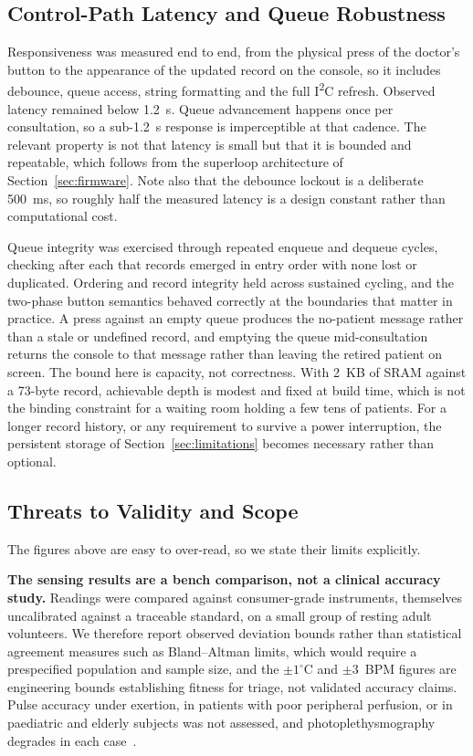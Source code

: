 \subsection{Control-Path Latency and Queue Robustness}
Responsiveness was measured end to end, from the physical press of the doctor's button to the
appearance of the updated record on the console, so it includes debounce, queue access, string
formatting and the full I\textsuperscript{2}C refresh. Observed latency remained below 1.2~s. Queue
advancement happens once per consultation, so a sub-1.2~s response is imperceptible at that cadence.
The relevant property is not that latency is small but that it is bounded and repeatable, which
follows from the superloop architecture of Section~\ref{sec:firmware}. Note also that the debounce
lockout is a deliberate 500~ms, so roughly half the measured latency is a design constant rather than
computational cost.

Queue integrity was exercised through repeated enqueue and dequeue cycles, checking after each that
records emerged in entry order with none lost or duplicated. Ordering and record integrity held
across sustained cycling, and the two-phase button semantics behaved correctly at the boundaries
that matter in practice. A press against an empty queue produces the no-patient message rather than
a stale or undefined record, and emptying the queue mid-consultation returns the console to that
message rather than leaving the retired patient on screen. The bound here is capacity, not
correctness. With 2~KB of SRAM against a 73-byte record, achievable depth is modest and fixed at
build time, which is not the binding constraint for a waiting room holding a few tens of patients.
For a longer record history, or any requirement to survive a power interruption, the persistent
storage of Section~\ref{sec:limitations} becomes necessary rather than optional.

\subsection{Threats to Validity and Scope}
\label{sec:threats}
The figures above are easy to over-read, so we state their limits explicitly.

\textbf{The sensing results are a bench comparison, not a clinical accuracy study.} Readings were
compared against consumer-grade instruments, themselves uncalibrated against a traceable standard,
on a small group of resting adult volunteers. We therefore report observed deviation bounds rather
than statistical agreement measures such as Bland--Altman limits, which would require a
prespecified population and sample size, and the $\pm 1^{\circ}$C and $\pm 3$~BPM figures are
engineering bounds establishing fitness for triage, not validated accuracy claims. Pulse accuracy
under exertion, in patients with poor peripheral perfusion, or in paediatric and elderly subjects
was not assessed, and photoplethysmography degrades in each case~\cite{allen2007ppg}.

